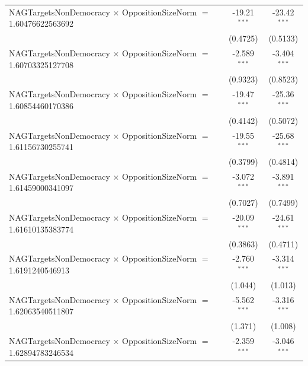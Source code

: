 \begin{tabular}{lcc}
   NAGTargetsNonDemocracy $\times$ OppositionSizeNorm $=$ 1.60476622563692      & -19.21$^{***}$       & -23.42$^{***}$\\   
                                                                                & (0.4725)             & (0.5133)\\   
   NAGTargetsNonDemocracy $\times$ OppositionSizeNorm $=$ 1.60703325127708      & -2.589$^{***}$       & -3.404$^{***}$\\   
                                                                                & (0.9323)             & (0.8523)\\   
   NAGTargetsNonDemocracy $\times$ OppositionSizeNorm $=$ 1.60854460170386      & -19.47$^{***}$       & -25.36$^{***}$\\   
                                                                                & (0.4142)             & (0.5072)\\   
   NAGTargetsNonDemocracy $\times$ OppositionSizeNorm $=$ 1.61156730255741      & -19.55$^{***}$       & -25.68$^{***}$\\   
                                                                                & (0.3799)             & (0.4814)\\   
   NAGTargetsNonDemocracy $\times$ OppositionSizeNorm $=$ 1.61459000341097      & -3.072$^{***}$       & -3.891$^{***}$\\   
                                                                                & (0.7027)             & (0.7499)\\   
   NAGTargetsNonDemocracy $\times$ OppositionSizeNorm $=$ 1.61610135383774      & -20.09$^{***}$       & -24.61$^{***}$\\   
                                                                                & (0.3863)             & (0.4711)\\   
   NAGTargetsNonDemocracy $\times$ OppositionSizeNorm $=$ 1.6191240546913       & -2.760$^{***}$       & -3.314$^{***}$\\   
                                                                                & (1.044)              & (1.013)\\   
   NAGTargetsNonDemocracy $\times$ OppositionSizeNorm $=$ 1.62063540511807      & -5.562$^{***}$       & -3.316$^{***}$\\   
                                                                                & (1.371)              & (1.008)\\   
   NAGTargetsNonDemocracy $\times$ OppositionSizeNorm $=$ 1.62894783246534      & -2.359$^{***}$       & -3.046$^{***}$\\   

\end{tabular}
